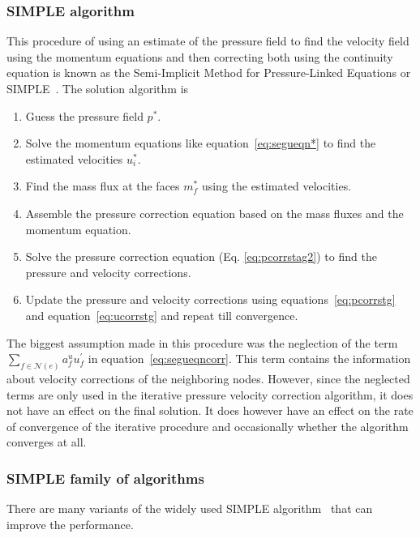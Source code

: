 \subsubsection{SIMPLE algorithm}
This procedure of using an estimate of the pressure field to find the velocity field using the momentum equations and then correcting both using the continuity equation is known as the Semi-Implicit Method for Pressure-Linked Equations or SIMPLE~\cite{Patankar1972, caretto1973two}. The solution algorithm is
\begin{enumerate}
    \item Guess the pressure field $p^{\ast}$.
    \item Solve the momentum equations like equation~\ref{eq:segueqn*} to find the estimated velocities $u_i^{\ast}$.
    \item Find the mass flux at the faces $m_f^{\ast}$ using the estimated velocities.
    \item Assemble the pressure correction equation based on the mass fluxes and the momentum equation.
    \item Solve the pressure correction equation (Eq. \ref{eq:pcorrstag2}) to find the pressure and velocity corrections.
    \item Update the pressure and velocity corrections using equations~\ref{eq:pcorrstg} and equation~\ref{eq:ucorrstg} and repeat till convergence.
\end{enumerate}
The biggest assumption made in this procedure was the neglection of the term $\sum_{f \in\mathcal{N}(e)} a_f^u u_f^{\prime}$ in equation~\ref{eq:segueqncorr}. This term contains the information about velocity corrections of the neighboring nodes. However, since the neglected terms are only used in the iterative pressure velocity correction algorithm, it does not have an effect on the final solution. It does however have an effect on the rate of convergence of the iterative procedure and occasionally whether the algorithm converges at all.

\subsubsection{SIMPLE family of algorithms}

There are many variants of the widely used SIMPLE algorithm~\cite{Patankar1980, Moukalled, Murthy2002, Xiao2018, pisoref, simplerref} that can improve the performance.
